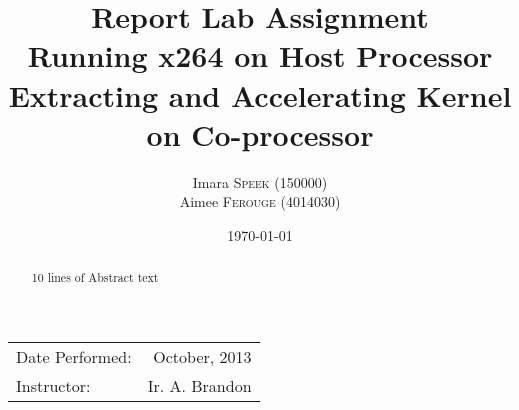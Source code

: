 \documentclass{article}
\title{Report Lab Assignment \\ Running x264 on Host Processor\\ Extracting and Accelerating Kernel on Co-processor} %
\author{Imara \textsc{Speek} (150000)\\ Aimee \textsc{Ferouge} (4014030)} %
\date{\today} %
\begin{document}
\maketitle %

\begin{center}
\begin{tabular}{l r}
Date Performed: & October, 2013 \\ %
Instructor: & Ir. A. Brandon %
\end{tabular}
\end{center}

 \begin{abstract}
 10 lines of Abstract text
 \end{abstract}



 




\appendix


%
%
%
%
%
\end{document}
